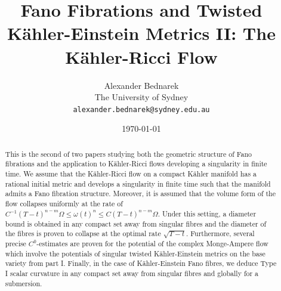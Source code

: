\documentclass[12pt]{article}
\title{Fano Fibrations and Twisted K\"ahler-Einstein Metrics II: The K\"ahler-Ricci Flow}
\author{Alexander Bednarek\\The University of Sydney\\\texttt{alexander.bednarek@sydney.edu.au}}
\date{\today}
\numberwithin{equation}{section}
\begin{document}
\maketitle

\begin{abstract}
\noindent This is the second of two papers studying both the geometric structure of Fano fibrations and the application to K\"ahler-Ricci flows developing a singularity in finite time. We assume that the K\"ahler-Ricci flow on a compact K\"ahler manifold has a rational initial metric and develops a singularity in finite time such that the manifold admits a Fano fibration structure. Moreover, it is assumed that the volume form of the flow collapses uniformly at the rate of $C^{-1}(T-t)^{n-m} \Omega \leq \omega(t)^n\leq C(T-t)^{n-m}\Omega$. Under this setting, a diameter bound is obtained in any compact set away from singular fibres and the diameter of the fibres is proven to collapse at the optimal rate $\sqrt{T-t}$. Furthermore, several precise $C^0$-estimates are proven for the potential of the complex Monge-Ampere flow which involve the potentials of singular twisted K\"ahler-Einstein metrics on the base variety from part I. Finally, in the case of K\"ahler-Einstein Fano fibres, we deduce Type I scalar curvature in any compact set away from singular fibres and globally for a submersion.
\end{abstract}
\end{document}
